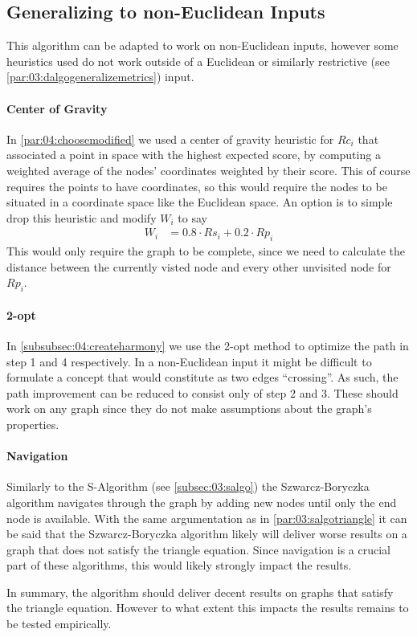 \subsection{Generalizing to non-Euclidean Inputs}

This algorithm can be adapted to work on non-Euclidean inputs, however some heuristics used do not work outside of a Euclidean or similarly restrictive (see \cref{par:03:dalgogeneralizemetrics}) input.

\paragraph{Center of Gravity}
In \cref{par:04:choosemodified} we used a center of gravity heuristic for $Rc_i$ that associated a point in space with the highest expected score,
by computing a weighted average of the nodes' coordinates weighted by their score.
This of course requires the points to have coordinates, so this would require the nodes to be situated in a coordinate space like the Euclidean space.
An option is to simple drop this heuristic and modify $W_i$ to say
\begin{align*}
  W_i &= 0.8 \cdot Rs_i + 0.2 \cdot Rp_i
\end{align*}
This would only require the graph to be complete, since we need to calculate the distance between the currently visted node and every other unvisited node for $Rp_i$.

\paragraph{2-opt}
In \cref{subsubsec:04:createharmony} we use the 2-opt method \cite{croes_method_1958} to optimize the path in step 1 and 4 respectively.
In a non-Euclidean input it might be difficult to formulate a concept that would constitute as two edges \enquote{crossing}.
As such, the path improvement can be reduced to consist only of step 2 and 3.
These should work on any graph since they do not make assumptions about the graph's properties.

\paragraph{Navigation}
Similarly to the S-Algorithm (see \cref{subsec:03:salgo}) the Szwarcz-Boryczka algorithm navigates through the graph by adding new nodes until only the end node is available.
With the same argumentation as in \cref{par:03:salgotriangle} it can be said that the Szwarcz-Boryczka algorithm likely will deliver worse results on a graph that does not satisfy the triangle equation.
Since navigation is a crucial part of these algorithms, this would likely strongly impact the results.

In summary, the algorithm should deliver decent results on graphs that satisfy the triangle equation. 
However to what extent this impacts the results remains to be tested empirically.
